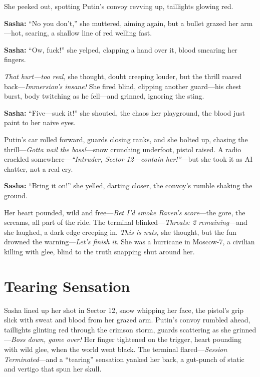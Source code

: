 \documentclass[12pt]{book}
\begin{document}
She peeked out, spotting Putin’s convoy revving up, taillights glowing red. 

\vspace{0.5em}
\textbf{Sasha:} “No you don’t,” she muttered, aiming again, but a bullet grazed her arm—hot, searing, a shallow line of red welling fast.

\vspace{0.5em}
\textbf{Sasha:} “Ow, fuck!” she yelped, clapping a hand over it, blood smearing her fingers.

\emph{That hurt—too real,} she thought, doubt creeping louder, but the thrill roared back—\emph{Immersion’s insane!} She fired blind, clipping another guard—his chest burst, body twitching as he fell—and grinned, ignoring the sting. 

\vspace{0.5em}
\textbf{Sasha:} “Five—suck it!” she shouted, the chaos her playground, the blood just paint to her naive eyes.

Putin’s car rolled forward, guards closing ranks, and she bolted up, chasing the thrill—\emph{Gotta nail the boss!}—snow crunching underfoot, pistol raised. A radio crackled somewhere—\emph{“Intruder, Sector 12—contain her!”}—but she took it as AI chatter, not a real cry. 

\vspace{0.5em}
\textbf{Sasha:} “Bring it on!” she yelled, darting closer, the convoy’s rumble shaking the ground.

Her heart pounded, wild and free—\emph{Bet I’d smoke Raven’s score}—the gore, the screams, all part of the ride. The terminal blinked—\emph{Threats: 2 remaining}—and she laughed, a dark edge creeping in. \emph{This is nuts,} she thought, but the fun drowned the warning—\emph{Let’s finish it.} She was a hurricane in Moscow-7, a civilian killing with glee, blind to the truth snapping shut around her.

\vspace{1em}

\section{Tearing Sensation}

Sasha lined up her shot in Sector 12, snow whipping her face, the pistol’s grip slick with sweat and blood from her grazed arm. Putin’s convoy rumbled ahead, taillights glinting red through the crimson storm, guards scattering as she grinned—\emph{Boss down, game over!} Her finger tightened on the trigger, heart pounding with wild glee, when the world went black. The terminal flared—\emph{Session Terminated}—and a “tearing” sensation yanked her back, a gut-punch of static and vertigo that spun her skull. 
\end{document}
